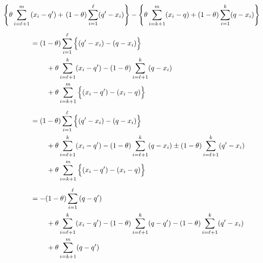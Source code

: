 \begin{align*} 
  \left\{ \theta \sum_{i=\ell+1}^m \right.
  & (x_i - q^{\prime}) +
    \left. (1 - \theta) \sum_{i=1}^{\ell} (q^{\prime} - x_i) \right\} -
    \left\{ \theta \sum_{i=k+1}^m (x_i - q) +
    (1 - \theta) \sum_{i=1}^k (q - x_i) \right\} \\[1ex]
  &= (1 - \theta) \sum_{i=1}^{\ell} \Big\{ (q^{\prime} - x_i) - (q - x_i) \Big\} \\
  &\hspace{8mm}
    + \theta \sum_{i=\ell+1}^k (x_i - q^{\prime})
    - (1 - \theta) \sum_{i=\ell+1}^k (q - x_i) \\
  &\hspace{8mm}
    + \theta \sum_{i=k+1}^m \Big\{ (x_i - q^{\prime})
    - (x_i - q) \Big\} \\[1ex]
  &= (1 - \theta) \sum_{i=1}^{\ell} \Big\{ (q^{\prime} - x_i) - (q - x_i) \Big\} \\
  &\hspace{8mm}
    + \theta \sum_{i=\ell+1}^k (x_i - q^{\prime})
    - (1 - \theta) \sum_{i=\ell+1}^k (q - x_i)
    \pm (1 - \theta) \sum_{i=\ell+1}^k (q^{\prime} - x_i) \\
  &\hspace{8mm}
    + \theta \sum_{i=k+1}^m \Big\{ (x_i - q^{\prime})
    - (x_i - q) \Big\} \\[1ex]
  &= -(1 - \theta) \sum_{i=1}^{\ell}\, (q - q^{\prime}) \\
  &\hspace{8mm}
    + \theta \sum_{i=\ell+1}^k (x_i - q^{\prime})
    - (1 - \theta) \sum_{i=\ell+1}^k (q - q^{\prime})
    - (1 - \theta) \sum_{i=\ell+1}^k (q^{\prime} - x_i) \\
  &\hspace{8mm}
    + \theta \sum_{i=k+1}^m (q - q^{\prime}) \\[1ex]

\end{align*}
